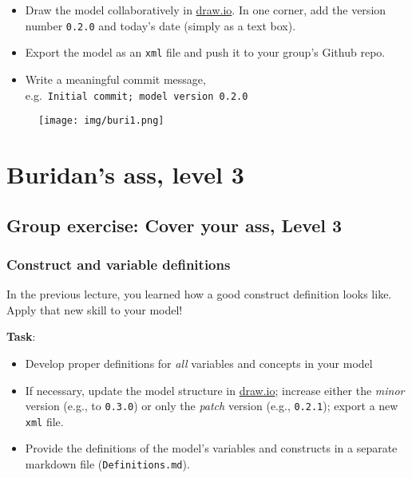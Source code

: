 \documentclass[
  letterpaper,
  DIV=11,
  numbers=noendperiod]{scrartcl}
\providecommand{\tightlist}{%
  \setlength{\itemsep}{0pt}\setlength{\parskip}{0pt}}\usepackage{longtable,booktabs,array}
\begin{document}
\begin{itemize}
\tightlist
\item
  Draw the model collaboratively in
  \href{https://www.drawio.com}{draw.io}. In one corner, add the version
  number \texttt{0.2.0} and today's date (simply as a text box).
\item
  Export the model as an \texttt{xml} file and push it to your group's
  Github repo.
\item
  Write a meaningful commit message,
  e.g.~\texttt{Initial\ commit;\ model\ version\ 0.2.0}
\end{itemize}

\begin{figure}

{\centering \texttt{[image: img/buri1.png]}

}

\end{figure}

\hypertarget{buridans-ass-level-3}{%
\section{Buridan's ass, level 3}\label{buridans-ass-level-3}}

\hypertarget{fa-people-group-size1x-group-exercise-cover-your-ass-level-3}{%
\subsection{\texorpdfstring{{ Group exercise: Cover
your ass, Level
3}}{ Group exercise: Cover your ass, Level 3}}\label{fa-people-group-size1x-group-exercise-cover-your-ass-level-3}}

\hypertarget{construct-and-variable-definitions}{%
\subsubsection{Construct and variable
definitions}\label{construct-and-variable-definitions}}

In the previous lecture, you learned how a good construct definition
looks like. Apply that new skill to your model!

\textbf{Task}:

\begin{itemize}
\tightlist
\item
  Develop proper definitions for \emph{all} variables and concepts in
  your model
\item
  If necessary, update the model structure in
  \href{https://www.drawio.com}{draw.io}; increase either the
  \emph{minor} version (e.g., to \texttt{0.3.0}) or only the
  \emph{patch} version (e.g., \texttt{0.2.1}); export a new \texttt{xml}
  file.
\item
  Provide the definitions of the model's variables and constructs in a
  separate markdown file (\texttt{Definitions.md}).
\end{itemize}
\end{document}
